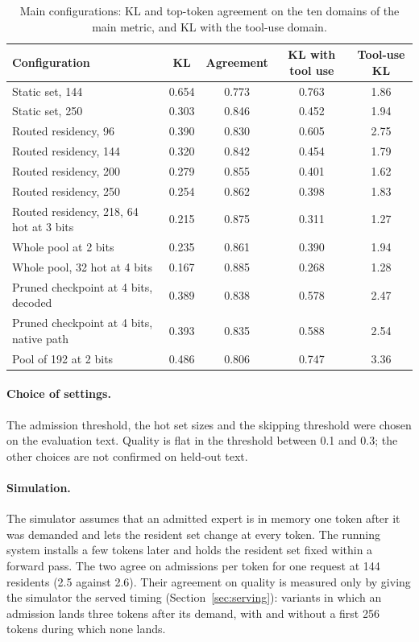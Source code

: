 \documentclass[11pt]{article}
\begin{document}
\begin{table}[ht]
\centering
\small
\begin{tabular}{@{}lcccc@{}}
\toprule
Configuration & KL & Agreement & KL with tool use & Tool-use KL \\
\midrule
Static set, 144 & 0.654 & 0.773 & 0.763 & 1.86 \\
Static set, 250 & 0.303 & 0.846 & 0.452 & 1.94 \\
Routed residency, 96 & 0.390 & 0.830 & 0.605 & 2.75 \\
Routed residency, 144 & 0.320 & 0.842 & 0.454 & 1.79 \\
Routed residency, 200 & 0.279 & 0.855 & 0.401 & 1.62 \\
Routed residency, 250 & 0.254 & 0.862 & 0.398 & 1.83 \\
Routed residency, 218, 64 hot at 3 bits & 0.215 & 0.875 & 0.311 & 1.27 \\
Whole pool at 2 bits & 0.235 & 0.861 & 0.390 & 1.94 \\
Whole pool, 32 hot at 4 bits & 0.167 & 0.885 & 0.268 & 1.28 \\
Pruned checkpoint at 4 bits, decoded & 0.389 & 0.838 & 0.578 & 2.47 \\
Pruned checkpoint at 4 bits, native path & 0.393 & 0.835 & 0.588 & 2.54 \\
Pool of 192 at 2 bits & 0.486 & 0.806 & 0.747 & 3.36 \\
\bottomrule
\end{tabular}
\caption{Main configurations: KL and top-token agreement on the ten domains of the main
metric, and KL with the tool-use domain.}
\label{tab:alldomains}
\end{table}

\paragraph{Choice of settings.} The admission threshold, the hot set sizes and the skipping
threshold were chosen on the evaluation text. Quality is flat in the threshold between 0.1 and
0.3; the other choices are not confirmed on held-out text.

\paragraph{Simulation.} The simulator assumes that an admitted expert is in memory one token
after it was demanded and lets the resident set change at every token. The running system
installs a few tokens later and holds the resident set fixed within a forward pass. The two
agree on admissions per token for one request at 144 residents (2.5 against 2.6). Their
agreement on quality is measured only by giving the simulator the served timing (Section~\ref{sec:serving}): variants in which an admission lands three tokens after its demand, with and without a first 256 tokens during which none lands.
\end{document}
